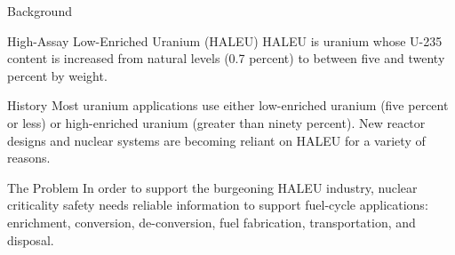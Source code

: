 \documentclass[10pt,aspectratio=169]{beamer}              %
\begin{document}
\begin{frame}{Background}
    \begin{block}{High-Assay Low-Enriched Uranium (HALEU)}
        HALEU is uranium whose U-235 content is increased from natural levels (0.7 percent) to between five and twenty percent by weight.
    \end{block}
    \begin{block}{History}
        Most uranium applications use either low-enriched uranium (five percent or less) or high-enriched uranium (greater than ninety percent). New reactor designs and nuclear systems are becoming reliant on HALEU for a variety of reasons.
    \end{block}
    \begin{block}{The Problem}
        In order to support the burgeoning HALEU industry, nuclear criticality safety needs reliable information to support fuel-cycle applications: enrichment, conversion, de-conversion, fuel fabrication, transportation, and disposal.
    \end{block}
\end{frame}
\end{document}
